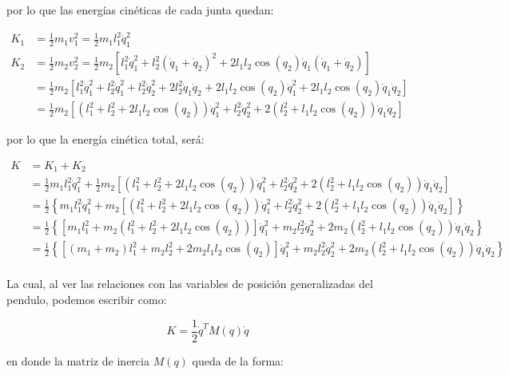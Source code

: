 \documentclass{article}
\begin{document}
por lo que las energías cinéticas de cada junta quedan:

\[
\begin{align}
K_1 &= \frac{1}{2} m_1 v_1^2 = \frac{1}{2} m_1 l_1^2 \dot{q}_1^2 \\
K_2 &= \frac{1}{2} m_2 v_2^2 = \frac{1}{2} m_2 \left[ l_1^2 \dot{q}_1^2 + l_2^2 (\dot{q}_1 + \dot{q}_2)^2 + 2 l_1 l_2 \cos{(q_2)} \dot{q}_1 (\dot{q}_1 + \dot{q}_2) \right] \\
&= \frac{1}{2} m_2 \left[ l_1^2 \dot{q}_1^2 + l_2^2 \dot{q}_1^2 + l_2^2 \dot{q}_2^2 + 2 l_2^2 \dot{q}_1 \dot{q}_2 + 2 l_1 l_2 \cos{(q_2)} \dot{q}_1^2 + 2 l_1 l_2 \cos{(q_2)} \dot{q}_1 \dot{q}_2 \right] \\
&= \frac{1}{2} m_2 \left[ \left( l_1^2 + l_2^2 + 2 l_1 l_2 \cos{(q_2)} \right) \dot{q}_1^2 + l_2^2 \dot{q}_2^2 + 2 \left( l_2^2 + l_1 l_2 \cos{(q_2)} \right) \dot{q}_1 \dot{q}_2 \right]
\end{align}
\]

por lo que la energía cinética total, será:

\[
\begin{align}
K &= K_1 + K_2 \\
&= \frac{1}{2} m_1 l_1^2 \dot{q}_1^2 + \frac{1}{2} m_2 \left[ \left( l_1^2 + l_2^2 + 2 l_1 l_2 \cos{(q_2)} \right) \dot{q}_1^2 + l_2^2 \dot{q}_2^2 + 2 \left( l_2^2 + l_1 l_2 \cos{(q_2)} \right) \dot{q}_1 \dot{q}_2 \right] \\
&= \frac{1}{2} \left\{ m_1 l_1^2 \dot{q}_1^2 + m_2 \left[ \left( l_1^2 + l_2^2 + 2 l_1 l_2 \cos{(q_2)} \right) \dot{q}_1^2 + l_2^2 \dot{q}_2^2 + 2 \left( l_2^2 + l_1 l_2 \cos{(q_2)} \right) \dot{q}_1 \dot{q}_2 \right] \right\} \\
&= \frac{1}{2} \left\{ \left[ m_1 l_1^2 + m_2 \left( l_1^2 + l_2^2 + 2 l_1 l_2 \cos{(q_2)} \right) \right] \dot{q}_1^2 + m_2 l_2^2 \dot{q}_2^2 + 2 m_2 \left( l_2^2 + l_1 l_2 \cos{(q_2)} \right) \dot{q}_1 \dot{q}_2\right\} \\
&= \frac{1}{2} \left\{ \left[ (m_1 + m_2) l_1^2 + m_2 l_2^2 + 2 m_2 l_1 l_2 \cos{(q_2)} \right] \dot{q}_1^2 + m_2 l_2^2 \dot{q}_2^2 + 2 m_2 \left( l_2^2 + l_1 l_2 \cos{(q_2)} \right) \dot{q}_1 \dot{q}_2\right\} \\
\end{align}
\]

La cual, al ver las relaciones con las variables de posición
generalizadas del pendulo, podemos escribir como:

\[
K = \frac{1}{2} \dot{q}^T M(q) \dot{q}
\]

en donde la matriz de inercia \(M(q)\) queda de la forma:
\end{document}
